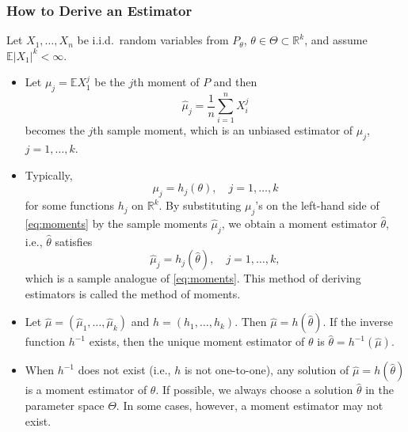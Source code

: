 \subsubsection{How to Derive an Estimator}
\begin{exam}
Let $X_1, \ldots, X_n$ be i.i.d.\ random variables from $P_\theta$, $\theta \in \Theta \subset \mathbb{R}^k$, and assume $\mathbb{E}|X_1|^k < \infty$.

\begin{itemize}
    \item Let $\mu_j = \mathbb{E} X_1^j$ be the $j$th moment of $P$ and then
    \[
    \hat{\mu}_j = \frac{1}{n} \sum_{i=1}^{n} X_i^j
    \]
    becomes the $j$th sample moment, which is an unbiased estimator of $\mu_j$, $j = 1, \ldots, k$.
    
    \item Typically,
    \begin{equation}
    \label{eq:moments}
    \mu_j = h_j(\theta), \quad j = 1, \ldots, k
    \end{equation}
    for some functions $h_j$ on $\mathbb{R}^k$. By substituting $\mu_j$'s on the left-hand side of \eqref{eq:moments} by the sample moments $\hat{\mu}_j$, we obtain a moment estimator $\hat{\theta}$, i.e., $\hat{\theta}$ satisfies
    \[
    \hat{\mu}_j = h_j(\hat{\theta}), \quad j = 1, \ldots, k,
    \]
    which is a sample analogue of \eqref{eq:moments}. This method of deriving estimators is called the method of moments.
    
    \item Let $\hat{\mu} = (\hat{\mu}_1, \ldots, \hat{\mu}_k)$ and $h = (h_1, \ldots, h_k)$. Then $\hat{\mu} = h(\hat{\theta})$. If the inverse function $h^{-1}$ exists, then the unique moment estimator of $\theta$ is $\hat{\theta} = h^{-1}(\hat{\mu})$.
    
    \item When $h^{-1}$ does not exist (i.e., $h$ is not one-to-one), any solution of $\hat{\mu} = h(\hat{\theta})$ is a moment estimator of $\theta$. If possible, we always choose a solution $\hat{\theta}$ in the parameter space $\Theta$. In some cases, however, a moment estimator may not exist.
\end{itemize}
\end{exam}

